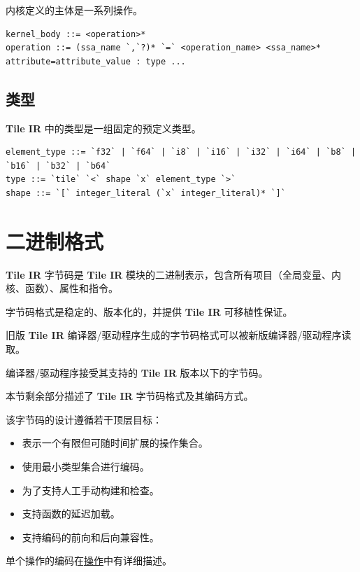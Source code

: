 \documentclass{article}
\begin{document}
内核定义的主体是一系列操作。


\begin{lstlisting}
kernel_body ::= <operation>*
operation ::= (ssa_name `,`?)* `=` <operation_name> <ssa_name>* attribute=attribute_value : type ...
\end{lstlisting}


\subsection{类型}

\textbf{Tile IR} 中的类型是一组固定的预定义类型。


\begin{lstlisting}
element_type ::= `f32` | `f64` | `i8` | `i16` | `i32` | `i64` | `b8` | `b16` | `b32` | `b64`
type ::= `tile` `<` shape `x` element_type `>`
shape ::= `[` integer_literal (`x` integer_literal)* `]`
\end{lstlisting}

\newpage
\section{二进制格式}

\textbf{Tile IR} 字节码是 \textbf{Tile IR} 模块的二进制表示，包含所有项目（全局变量、内核、函数）、属性和指令。


字节码格式是稳定的、版本化的，并提供 \textbf{Tile IR} 可移植性保证。

旧版 \textbf{Tile IR} 编译器/驱动程序生成的字节码格式可以被新版编译器/驱动程序读取。

编译器/驱动程序接受其支持的 \textbf{Tile IR} 版本以下的字节码。


本节剩余部分描述了 \textbf{Tile IR} 字节码格式及其编码方式。


该字节码的设计遵循若干顶层目标：

\begin{itemize}
\item 表示一个有限但可随时间扩展的操作集合。
\item 使用最小类型集合进行编码。
\item 为了支持人工手动构建和检查。
\item 支持函数的延迟加载。
\item 支持编码的前向和后向兼容性。

\end{itemize}
单个操作的编码在\href{https://docs.nvidia.com/cuda/tile-ir/latest/sections/operations.html#section-operations}{操作}中有详细描述。
\end{document}

